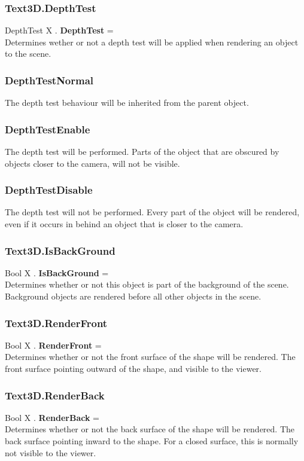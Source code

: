 \documentclass[10pt]{book}
\begin{document}
\subsubsection{Text3D.DepthTest \label{F:Text3D:DepthTest}}
DepthTest X . \textbf{DepthTest} = \\
Determines wether or not a depth test will be applied when rendering an object to the scene.

\subsubsection{DepthTestNormal \label{T:DepthTest|DepthTestNormal}}
The depth test behaviour will be inherited from the parent object.

\subsubsection{DepthTestEnable \label{T:DepthTest|DepthTestEnable}}
The depth test will be performed. Parts of the object that are obscured by objects closer to the camera, will not be visible.

\subsubsection{DepthTestDisable \label{T:DepthTest|DepthTestDisable}}
The depth test will not be performed. Every part of the object will be rendered, even if it occurs in behind an object that is closer to the camera.

\subsubsection{Text3D.IsBackGround \label{F:Text3D:IsBackGround}}
Bool X . \textbf{IsBackGround} = \\
Determines whether or not this object is part of the background of the scene. Background objects are rendered before all other objects in the scene.

\subsubsection{Text3D.RenderFront \label{F:Text3D:RenderFront}}
Bool X . \textbf{RenderFront} = \\
Determines whether or not the front surface of the shape will be rendered. The front surface pointing outward of the shape, and visible to the viewer.

\subsubsection{Text3D.RenderBack \label{F:Text3D:RenderBack}}
Bool X . \textbf{RenderBack} = \\
Determines whether or not the back surface of the shape will be rendered. The back surface pointing inward to the shape. For a closed surface, this is normally not visible to the viewer.
\end{document}
